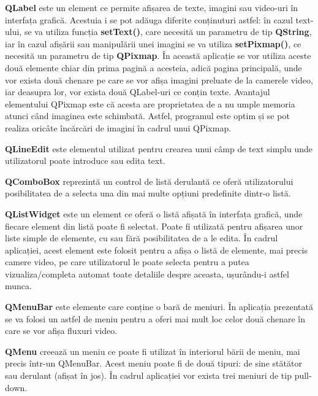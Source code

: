 \documentclass[12pt]{article}
\begin{document}
\textbf{QLabel} este un element ce permite afișarea de texte, imagini sau video-uri \^{i}n interfața grafic\u{a}. Acestuia i se pot ad\u{a}uga diferite conținuturi astfel: \^{i}n cazul text-ului, se va utiliza funcția \textbf{setText()}, care necesit\u{a} un parametru de tip \textbf{QString}, iar \^{i}n cazul afiș\u{a}rii sau manipul\u{a}rii unei imagini se va utiliza \textbf{setPixmap()}, ce necesit\u{a} un parametru de tip \textbf{QPixmap}. \^{I}n aceast\u{a} aplicație se vor utiliza aceste dou\u{a} elemente chiar din prima pagin\u{a} a acesteia, adic\u{a} pagina principal\u{a}, unde vor exista dou\u{a} chenare pe care se vor afișa imagini preluate de la camerele video, iar deasupra lor, vor exista dou\u{a} QLabel-uri ce conțin texte. Avantajul elementului QPixmap este c\u{a} acesta are proprietatea de a nu umple memoria atunci c\^{a}nd imaginea este schimbat\u{a}. Astfel, programul este optim și se pot realiza oric\^{a}te \^{i}nc\u{a}rc\u{a}ri de imagini \^{i}n cadrul unui QPixmap.

\textbf{QLineEdit} este elementul utilizat pentru crearea unui c\^{a}mp de text simplu unde utilizatorul poate introduce sau edita text.

\textbf{QComboBox} reprezint\u{a} un control de list\u{a} derulant\u{a} ce ofer\u{a} utilizatorului posibilitatea de a selecta una din mai multe opțiuni predefinite dintr-o list\u{a}.

\textbf{QListWidget} este un element ce ofer\u{a} o list\u{a} afișat\u{a} \^{i}n interfața grafic\u{a}, unde fiecare element din list\u{a} poate fi selectat. Poate fi utilizat\u{a} pentru afișarea unor liste simple de elemente, cu sau f\u{a}r\u{a} posibilitatea de a le edita. \^{I}n cadrul aplicației, acest element este folosit pentru a afișa o list\u{a} de elemente, mai precis camere video, pe care utilizatorul le poate selecta pentru a putea vizualiza/completa automat toate detaliile despre aceasta, ușur\^{a}ndu-i astfel munca.

\textbf{QMenuBar} este elemente care conține o bar\u{a} de meniuri. \^{I}n aplicația prezentat\u{a} se va folosi un astfel de meniu pentru a oferi mai mult loc celor dou\u{a} chenare \^{i}n care se vor afișa fluxuri video. 

\textbf{QMenu} creeaz\u{a} un meniu ce poate fi utilizat \^{i}n interiorul b\u{a}rii de meniu, mai precis \^{i}ntr-un QMenuBar. Acest meniu poate fi de dou\u{a} tipuri: de sine st\u{a}t\u{a}tor sau derulant (afișat \^{i}n jos). \^{I}n cadrul aplicației vor exista trei meniuri de tip pull-down.
\end{document}

